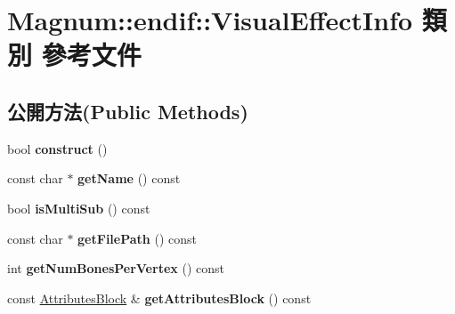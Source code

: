 \hypertarget{class_magnum_1_1endif_1_1_visual_effect_info}{}\section{Magnum\+:\+:endif\+:\+:Visual\+Effect\+Info 類別 參考文件}
\label{class_magnum_1_1endif_1_1_visual_effect_info}
\subsection*{公開方法(Public Methods)}
\begin{DoxyCompactItemize}
\item 
bool {\bfseries construct} ()\hypertarget{class_magnum_1_1endif_1_1_visual_effect_info_a329d633454277682d6c187a19eacadfa}{}\label{class_magnum_1_1endif_1_1_visual_effect_info_a329d633454277682d6c187a19eacadfa}

\item 
const char $\ast$ {\bfseries get\+Name} () const \hypertarget{class_magnum_1_1endif_1_1_visual_effect_info_a1623b29fe75fede722fef9f7b73a1551}{}\label{class_magnum_1_1endif_1_1_visual_effect_info_a1623b29fe75fede722fef9f7b73a1551}

\item 
bool {\bfseries is\+Multi\+Sub} () const \hypertarget{class_magnum_1_1endif_1_1_visual_effect_info_a84dcd9e8d73b3f3dff0a33e65478ef83}{}\label{class_magnum_1_1endif_1_1_visual_effect_info_a84dcd9e8d73b3f3dff0a33e65478ef83}

\item 
const char $\ast$ {\bfseries get\+File\+Path} () const \hypertarget{class_magnum_1_1endif_1_1_visual_effect_info_a1be241a69d1c1b78ecef9e02a2fc0285}{}\label{class_magnum_1_1endif_1_1_visual_effect_info_a1be241a69d1c1b78ecef9e02a2fc0285}

\item 
int {\bfseries get\+Num\+Bones\+Per\+Vertex} () const \hypertarget{class_magnum_1_1endif_1_1_visual_effect_info_a7b7076955903d04470dfcecdca7ea920}{}\label{class_magnum_1_1endif_1_1_visual_effect_info_a7b7076955903d04470dfcecdca7ea920}

\item 
const \hyperlink{class_magnum_1_1_attributes_block}{Attributes\+Block} \& {\bfseries get\+Attributes\+Block} () const \hypertarget{class_magnum_1_1endif_1_1_visual_effect_info_ae6dffb0270692901e363c020dd8ea417}{}\label{class_magnum_1_1endif_1_1_visual_effect_info_ae6dffb0270692901e363c020dd8ea417}


\end{DoxyCompactItemize}
